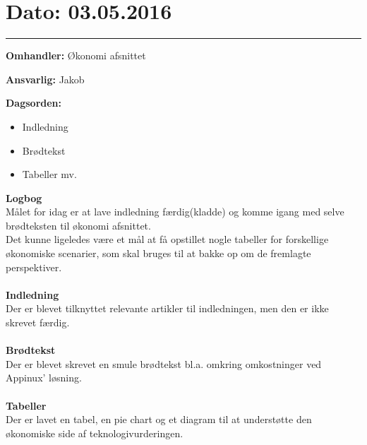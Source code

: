 
\section{Dato: 03.05.2016}
\hrule

\textbf{Omhandler:} Økonomi afsnittet

\textbf{Ansvarlig:} Jakob

\textbf{Dagsorden:}
\begin{itemize}
	\item Indledning
	\item Brødtekst
	\item Tabeller mv.
\end{itemize}

\textbf{Logbog}
\\
Målet for idag er at lave indledning færdig(kladde) og komme igang med selve brødteksten til økonomi afsnittet. \\
Det kunne ligeledes være et mål at få opstillet nogle tabeller for forskellige økonomiske scenarier, som skal bruges til at bakke op om de fremlagte perspektiver. 
\\ \\

\textbf{Indledning}
\\
Der er blevet tilknyttet relevante artikler til indledningen, men den er ikke skrevet færdig.
\\ \\

\textbf{Brødtekst}
\\
Der er blevet skrevet en smule brødtekst bl.a. omkring omkostninger ved Appinux' løsning.
\\ \\

\textbf{Tabeller}
\\
Der er lavet en tabel, en pie chart og et diagram til at understøtte den økonomiske side af teknologivurderingen.
\\ \\